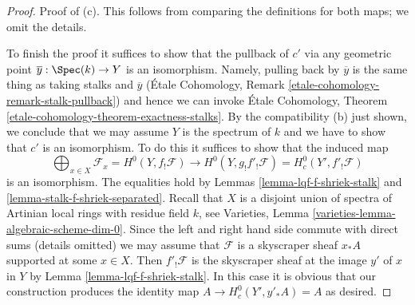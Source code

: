 \begin{proof}
\medskip\noindent
Proof of (c). This follows from comparing the definitions
for both maps; we omit the details.

\medskip\noindent
To finish the proof it suffices to show that the pullback of
$c'$ via any geometric point $\overline{y} : \Spec(k) \to Y$
is an isomorphism. Namely, pulling back by $\overline{y}$
is the same thing as taking stalks and $\overline{y}$
(\'Etale Cohomology, Remark \ref{etale-cohomology-remark-stalk-pullback})
and hence we can invoke
\'Etale Cohomology, Theorem \ref{etale-cohomology-theorem-exactness-stalks}.
By the compatibility (b) just shown, we 
conclude that we may assume $Y$ is the spectrum of $k$
and we have to show that $c'$ is an isomorphism.
To do this it suffices to show that the induced map
$$
\bigoplus\nolimits_{x \in X} \mathcal{F}_x = H^0(Y, f_!\mathcal{F})
\longrightarrow
H^0(Y, g_!f'_!\mathcal{F}) = H^0_c(Y', f'_!\mathcal{F})
$$
is an isomorphism. The equalities hold by
Lemmas \ref{lemma-lqf-f-shriek-stalk} and
\ref{lemma-stalk-f-shriek-separated}.
Recall that $X$ is a disjoint union of
spectra of Artinian local rings with residue field $k$, see
Varieties, Lemma \ref{varieties-lemma-algebraic-scheme-dim-0}.
Since the left and right hand side commute with direct
sums (details omitted) we may assume that $\mathcal{F}$ is a skyscraper
sheaf $x_*A$ supported at some $x \in X$.
Then $f'_!\mathcal{F}$ is the skyscraper sheaf at the
image $y'$ of $x$ in $Y$ by Lemma \ref{lemma-lqf-f-shriek-stalk}.
In this case it is obvious that our construction
produces the identity map $A \to H^0_c(Y', y'_*A) = A$
as desired.
\end{proof}


